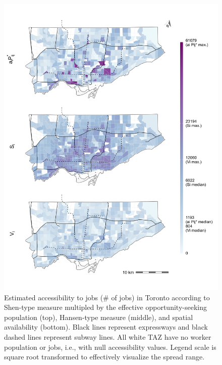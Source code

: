 \documentclass[10pt,letterpaper]{article}
\begin{document}
\begin{figure}
\includegraphics[width=1\linewidth]{images/access-job-Toronto-plot} \caption{\label{fig:absolute-accessibility-plot}Estimated accessibility to jobs (\# of jobs) in Toronto according to Shen-type measure multipled by the effective opportunity-seeking population (top), Hansen-type measure (middle), and spatial availability (bottom). Black lines represent expressways and black dashed lines represent subway lines. All white TAZ have no worker population or jobs, i.e., with null accessibility values. Legend scale is square root transformed to effectively visualize the spread range.}\label{fig:absolute-accessibility-plot}
\end{figure}
\end{document}
